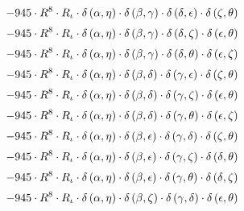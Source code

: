 \begin{subequations}
\begin{gather}
 \\[0.2em] \notag 		 - 945 \cdot R^{8} \cdot R_{\iota{}} \cdot \delta{}\left(\alpha{}, \eta{}\right) \cdot \delta{}\left(\beta{}, \gamma{}\right) \cdot \delta{}\left(\delta{}, \epsilon{}\right) \cdot \delta{}\left(\zeta{}, \theta{}\right) 
 \\[0.2em] \notag 		 - 945 \cdot R^{8} \cdot R_{\iota{}} \cdot \delta{}\left(\alpha{}, \eta{}\right) \cdot \delta{}\left(\beta{}, \gamma{}\right) \cdot \delta{}\left(\delta{}, \zeta{}\right) \cdot \delta{}\left(\epsilon{}, \theta{}\right) 
 \\[0.2em] \notag 		 - 945 \cdot R^{8} \cdot R_{\iota{}} \cdot \delta{}\left(\alpha{}, \eta{}\right) \cdot \delta{}\left(\beta{}, \gamma{}\right) \cdot \delta{}\left(\delta{}, \theta{}\right) \cdot \delta{}\left(\epsilon{}, \zeta{}\right) 
 \\[0.2em] \notag 		 - 945 \cdot R^{8} \cdot R_{\iota{}} \cdot \delta{}\left(\alpha{}, \eta{}\right) \cdot \delta{}\left(\beta{}, \delta{}\right) \cdot \delta{}\left(\gamma{}, \epsilon{}\right) \cdot \delta{}\left(\zeta{}, \theta{}\right) 
 \\[0.2em] \notag 		 - 945 \cdot R^{8} \cdot R_{\iota{}} \cdot \delta{}\left(\alpha{}, \eta{}\right) \cdot \delta{}\left(\beta{}, \delta{}\right) \cdot \delta{}\left(\gamma{}, \zeta{}\right) \cdot \delta{}\left(\epsilon{}, \theta{}\right) 
 \\[0.2em] \notag 		 - 945 \cdot R^{8} \cdot R_{\iota{}} \cdot \delta{}\left(\alpha{}, \eta{}\right) \cdot \delta{}\left(\beta{}, \delta{}\right) \cdot \delta{}\left(\gamma{}, \theta{}\right) \cdot \delta{}\left(\epsilon{}, \zeta{}\right) 
 \\[0.2em] \notag 		 - 945 \cdot R^{8} \cdot R_{\iota{}} \cdot \delta{}\left(\alpha{}, \eta{}\right) \cdot \delta{}\left(\beta{}, \epsilon{}\right) \cdot \delta{}\left(\gamma{}, \delta{}\right) \cdot \delta{}\left(\zeta{}, \theta{}\right) 
 \\[0.2em] \notag 		 - 945 \cdot R^{8} \cdot R_{\iota{}} \cdot \delta{}\left(\alpha{}, \eta{}\right) \cdot \delta{}\left(\beta{}, \epsilon{}\right) \cdot \delta{}\left(\gamma{}, \zeta{}\right) \cdot \delta{}\left(\delta{}, \theta{}\right) 
 \\[0.2em] \notag 		 - 945 \cdot R^{8} \cdot R_{\iota{}} \cdot \delta{}\left(\alpha{}, \eta{}\right) \cdot \delta{}\left(\beta{}, \epsilon{}\right) \cdot \delta{}\left(\gamma{}, \theta{}\right) \cdot \delta{}\left(\delta{}, \zeta{}\right) 
 \\[0.2em] \notag 		 - 945 \cdot R^{8} \cdot R_{\iota{}} \cdot \delta{}\left(\alpha{}, \eta{}\right) \cdot \delta{}\left(\beta{}, \zeta{}\right) \cdot \delta{}\left(\gamma{}, \delta{}\right) \cdot \delta{}\left(\epsilon{}, \theta{}\right) 

\end{gather}
\end{subequations}
